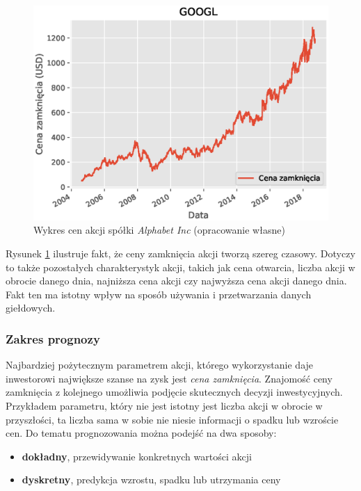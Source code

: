 \documentclass[a4paper, twoside, 11pt, openright]{article}
\begin{document}
\begin{figure}[H]
\centering \includegraphics[scale=0.9]{img/linear_regression/l_r_stock_data}
\caption{Wykres cen akcji spółki \textit{Alphabet Inc} (opracowanie własne)}
\label{alphabet_history}
\end{figure}

Rysunek \ref{alphabet_history} ilustruje fakt, że ceny zamknięcia akcji tworzą szereg czasowy. Dotyczy to także pozostałych charakterystyk akcji, takich jak cena otwarcia, liczba akcji w obrocie danego dnia, najniższa cena akcji czy najwyższa cena akcji danego dnia. Fakt ten ma istotny wpływ na sposób używania i przetwarzania danych giełdowych.

\subsubsection{Zakres prognozy}

Najbardziej pożytecznym parametrem akcji, którego wykorzystanie daje inwestorowi największe szanse na zysk jest \textit{cena zamknięcia}. Znajomość ceny zamknięcia z kolejnego umożliwia podjęcie skutecznych decyzji inwestycyjnych. Przykładem parametru, który nie jest istotny jest liczba akcji w obrocie w przyszłości, ta liczba sama w sobie nie niesie informacji o spadku lub wzroście cen. Do tematu prognozowania można podejść na dwa sposoby:
\begin{itemize}
\item{\textbf{dokładny}, przewidywanie konkretnych wartości akcji}
\item{\textbf{dyskretny}, predykcja wzrostu, spadku lub utrzymania ceny}
\end{itemize}
\end{document}

